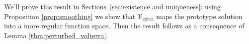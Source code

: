 \documentclass{article}
\theoremstyle{plain}
\newtheorem{thm}{Theorem}
\newcommand{\C}{\mathbb{C}}
\newcommand{\holoL}[1]{\mathcal{H}L^{#1}} %
\newcommand{\softpart}{\mathcal{V}_\text{extra}}
\begin{document}
We'll prove this result in Sections~\ref{sec:existence and uniqueness}: using Proposition \ref{prop:smoothing} we show that $\softpart$ maps the prototype solution into a more regular function space. Then the result follows as a consequence of Lemma \ref{thm:perturbed_volterra}.  




\end{document}
